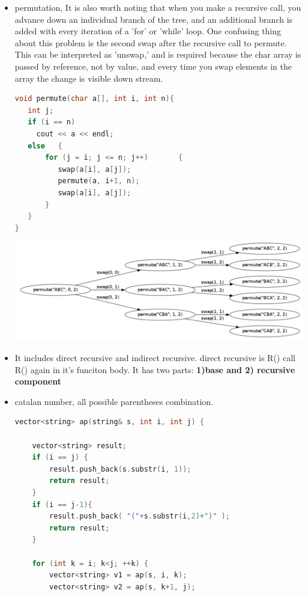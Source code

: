 \documentclass[a4paper,11pt,twoside]{book}
\begin{document}
\begin{itemize}
\begin{enumerate}
\end{enumerate}

	\item permutation, It is also worth noting that when you make a recursive call, you advance down an individual branch of the tree, and an additional branch is added with every iteration of a 'for' or 'while' loop. One confusing thing about this problem is the second swap after the recursive call to permute. This can be interpreted as 'unswap,' and is required because the char array is passed by reference, not by value, and every time you swap elements in the array the change is visible down stream.

\begin{lstlisting}[frame=single, language=c++]
void permute(char a[], int i, int n){
   int j;
   if (i == n)
     cout << a << endl;
   else   {
       for (j = i; j <= n; j++)       {
          swap(a[i], a[j]);          
          permute(a, i+1, n);
          swap(a[i], a[j]);
       }
   }
} 
\end{lstlisting}

\includegraphics[scale=0.25]{pics/permutation.png}

	\item It includes direct recursive and indirect recursive. direct recursive is R() call R() again in it's funciton body. It has two parts: \textbf{1)base and 2) recursive component}



	\item catalan number, all possible parentheses combination. 
\begin{lstlisting}[frame=single, language=c++]
vector<string> ap(string& s, int i, int j) {
	
	vector<string> result;
	if (i == j) {
		result.push_back(s.substr(i, 1));
		return result;
	}
	if (i == j-1){
		result.push_back( "("+s.substr(i,2)+")" );
		return result;
	}
	
	for (int k = i; k<j; ++k) {
		vector<string> v1 = ap(s, i, k);
		vector<string> v2 = ap(s, k+1, j);
		

\end{lstlisting}
\end{itemize}
\end{document}
